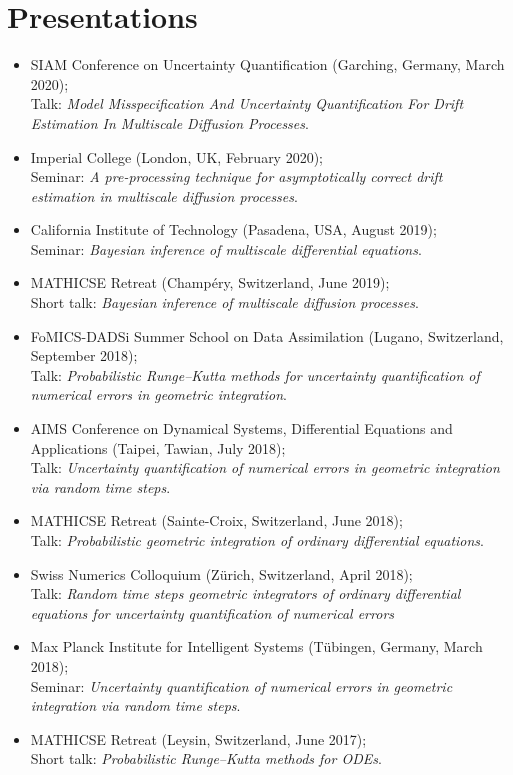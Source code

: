 \section*{Presentations}

\begin{itemize}
	\item {\sc SIAM Conference on Uncertainty Quantification} (Garching, Germany, March 2020);\\
	Talk: \textit{Model Misspecification And Uncertainty Quantification For Drift Estimation In Multiscale Diffusion Processes}.
	\item {\sc Imperial College} (London, UK, February 2020); \\
	Seminar: \textit{A pre-processing technique for asymptotically correct drift estimation in multiscale diffusion processes}.	
	\item {\sc California Institute of Technology} (Pasadena, USA, August 2019); \\
	Seminar: \textit{Bayesian inference of multiscale differential equations}.
	\item {\sc MATHICSE Retreat} (Champéry, Switzerland, June 2019);\\
	Short talk: \textit{Bayesian inference of multiscale diffusion processes}.
	\item {\sc FoMICS-DADSi Summer School on Data Assimilation} (Lugano, Switzerland, September 2018); \\
	Talk: \textit{Probabilistic Runge--Kutta methods	for uncertainty quantification of numerical errors in geometric integration}.
	\item {\sc AIMS Conference on Dynamical Systems, Differential Equations and Applications} (Taipei, Tawian, July 2018);\\
	Talk: \textit{Uncertainty quantification of numerical errors in geometric integration via random time steps}.
	\item {\sc MATHICSE Retreat} (Sainte-Croix, Switzerland, June 2018);\\
	Talk: \textit{Probabilistic geometric integration of ordinary differential equations}.
	\item {\sc Swiss Numerics Colloquium} (Zürich, Switzerland, April 2018);\\
	Talk: \textit{Random time steps geometric integrators of ordinary differential equations for uncertainty quantification of numerical errors}
	\item {\sc Max Planck Institute for Intelligent Systems} (Tübingen, Germany, March 2018); \\
	Seminar: \textit{Uncertainty quantification of numerical errors in geometric integration via random time steps}.
	\item {\sc MATHICSE Retreat} (Leysin, Switzerland, June 2017);\\
	Short talk: \textit{Probabilistic Runge--Kutta methods for ODEs}.
\end{itemize}